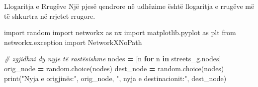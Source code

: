 \documentclass[
  ignorenonframetext,
]{beamer}
\newenvironment{Shaded}{\begin{snugshade}}{\end{snugshade}}
\newcommand{\BuiltInTok}[1]{#1}
\newcommand{\CommentTok}[1]{\textcolor[rgb]{0.56,0.35,0.01}{\textit{#1}}}
\newcommand{\ControlFlowTok}[1]{\textcolor[rgb]{0.13,0.29,0.53}{\textbf{#1}}}
\newcommand{\ImportTok}[1]{#1}
\newcommand{\KeywordTok}[1]{\textcolor[rgb]{0.13,0.29,0.53}{\textbf{#1}}}
\newcommand{\NormalTok}[1]{#1}
\newcommand{\OperatorTok}[1]{\textcolor[rgb]{0.81,0.36,0.00}{\textbf{#1}}}
\newcommand{\StringTok}[1]{\textcolor[rgb]{0.31,0.60,0.02}{#1}}
\begin{document}
\begin{frame}[fragile]{Llogaritja e Rrugëve}
\protect\hypertarget{llogaritja-e-rruguxebve}{}
Një pjesë qendrore në udhëzime është llogaritja e rrugëve më të shkurtra
në rrjetet rrugore.


\begin{Shaded}
\begin{Highlighting}[]
\ImportTok{import}\NormalTok{ random}
\ImportTok{import}\NormalTok{ networkx }\ImportTok{as}\NormalTok{ nx}
\ImportTok{import}\NormalTok{ matplotlib.pyplot }\ImportTok{as}\NormalTok{ plt}
\ImportTok{from}\NormalTok{ networkx.exception }\ImportTok{import}\NormalTok{ NetworkXNoPath}

\CommentTok{\# zgjidhni dy nyje të rastësishme}
\NormalTok{nodes }\OperatorTok{=}\NormalTok{ [n }\ControlFlowTok{for}\NormalTok{ n }\KeywordTok{in}\NormalTok{ streets\_g.nodes]}
\NormalTok{orig\_node }\OperatorTok{=}\NormalTok{ random.choice(nodes)}
\NormalTok{dest\_node }\OperatorTok{=}\NormalTok{ random.choice(nodes)}
\BuiltInTok{print}\NormalTok{(}\StringTok{"Nyja e origjinës:"}\NormalTok{, orig\_node, }\StringTok{", nyja e destinacionit:"}\NormalTok{, dest\_node)}
\end{Highlighting}
\end{Shaded}
\end{frame}
\end{document}
